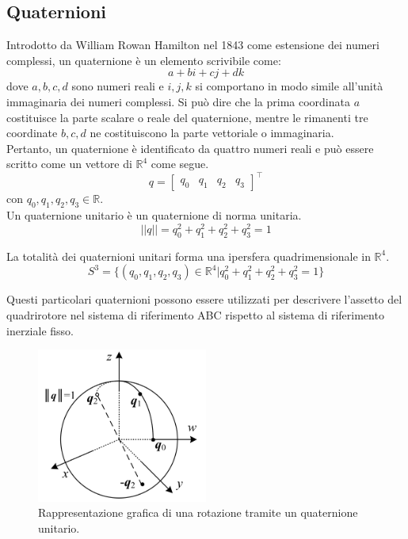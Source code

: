 \subsection{Quaternioni}
Introdotto da William Rowan Hamilton nel 1843 come estensione dei numeri complessi, un quaternione è un elemento scrivibile come:
\[ a + bi + cj + dk \]
dove $a, b, c, d$ sono numeri reali e $i, j, k$ si comportano in modo simile all'unità immaginaria dei numeri complessi. Si può dire che la prima coordinata $a$ costituisce la parte scalare o reale del quaternione, mentre le rimanenti tre coordinate $b, c, d$ ne costituiscono la parte vettoriale o immaginaria.\\

Pertanto, un quaternione è identificato da quattro numeri reali e può essere scritto come un vettore di $\mathbb{R}^4$ come segue.
\[
q = \begin{bmatrix}
q_0 & q_1 & q_2 & q_3
\end{bmatrix}^\top
\]
con $q_0, q_1, q_2, q_3 \in \mathbb{R}$.\\

Un quaternione unitario è un quaternione di norma unitaria.
\[ || q || = q_0^2 + q_1^2 + q_2^2 + q_3^2 = 1 \]

La totalità dei quaternioni unitari forma una ipersfera quadrimensionale in $\mathbb{R}^4$.
\[ S^3 = \{ (q_0, q_1, q_2, q_3) \in \mathbb{R}^4 | q_0^2 + q_1^2 + q_2^2 + q_3^2 = 1\} \]

 Questi particolari quaternioni possono essere utilizzati per descrivere l'assetto del quadrirotore nel sistema di riferimento \acs{ABC} rispetto al sistema di riferimento inerziale fisso.

\begin{figure}[H]
    \centering
    \includegraphics[width=0.5\textwidth]{gfx/quaternion}
    \caption[Rappresentazione grafica di una rotazione tramite un quaternione unitario.]{Rappresentazione grafica di una rotazione tramite un quaternione unitario.}
    \label{fig:quat}
\end{figure}

